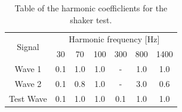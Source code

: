 \begin{table}[hbtp]
\centering
\begin{tabular}{|c|cccccc|}
\hline
\multirow{2}{*}{Signal} & \multicolumn{6}{c|}{Harmonic frequency {[}Hz{]}} \\
                        & 30     & 70     & 100   & 300   & 800   & 1400   \\ \hline
Wave 1                  & 0.1    & 1.0    & 1.0   & -     & 1.0   & 1.0    \\
Wave 2                  & 0.1    & 0.8    & 1.0   & -     & 3.0   & 0.6    \\
Test Wave               & 0.1    & 1.0    & 1.0   & 0.1   & 1.0   & 1.0    \\ \hline
\end{tabular}
\caption{Table of the harmonic coefficlients for the shaker test.}
\label{tab:shaker}
\end{table}

